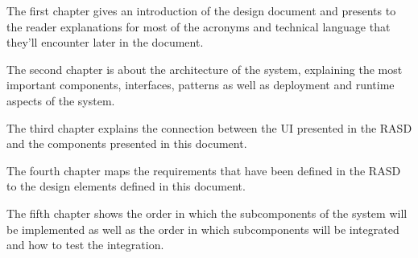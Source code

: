 The first chapter gives an introduction of the design document and presents to the reader explanations for most of the acronyms and technical language that they'll encounter later in the document.

The second chapter is about the architecture of the system, explaining the most important components, interfaces, patterns as well as deployment and runtime aspects of the system.

The third chapter explains the connection between the UI presented in the RASD and the components presented in this document.

The fourth chapter maps the requirements that have been defined in the RASD to the design elements defined in this document.

The fifth chapter shows the order in which the subcomponents of the system will be implemented as well as the order in which subcomponents will be integrated and how to test the integration. 